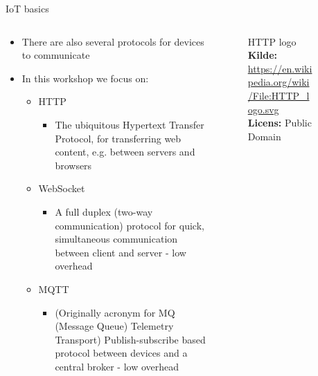 \documentclass[aspectratio=169]{beamer}
\begin{document}
\begin{frame}{IoT basics}
\begin{columns}
	\begin{column}{0.6\textwidth}
		\begin{textBox}
			\begin{itemize}
				\item There are also several protocols for devices to communicate
				\item In this workshop we focus on:
				\begin{itemize}
					\item HTTP
						\begin{itemize}
							\item The ubiquitous Hypertext Transfer Protocol, for transferring web content, e.g. between servers and browsers
						\end{itemize}
					\item WebSocket
						\begin{itemize}
							\item A full duplex (two-way communication) protocol for quick, simultaneous communication between client and server - low overhead
						\end{itemize}
					\item MQTT
						\begin{itemize}
							\item (Originally acronym for MQ (Message Queue) Telemetry Transport) Publish-subscribe based protocol between devices and a central broker - low overhead
						\end{itemize}
				\end{itemize}
			\end{itemize}
		\end{textBox}
	\end{column}
	\begin{column}{0.4\textwidth}
		\centering
		\captionsetup{format=tcbcaptionsmall}
		\begin{columns}
			\begin{column}{0.45\textwidth}
				\begin{figure}[height=0.2\textheight]
  					
  					\caption{HTTP logo
  					\captionline \textbf{Kilde:} \url{https://en.wikipedia.org/wiki/File:HTTP_logo.svg}
  					\captionline \textbf{Licens:} Public Domain}
  					\label{fig:http-logo}
				\end{figure}
			\end{column}
			\begin{column}{0.45\textwidth}

\end{column}
\end{columns}
\end{column}
\end{columns}
\end{frame}
\end{document}
